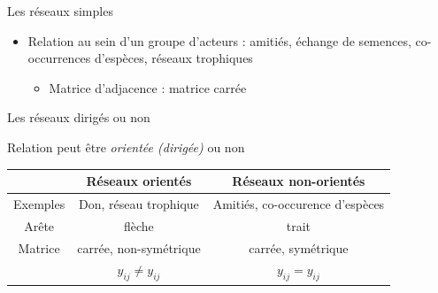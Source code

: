 \documentclass[compress,10pt]{beamer}
\begin{document}
\begin{frame}{Les réseaux simples}

\begin{itemize}

\item Relation au sein d'un groupe d'acteurs :  amitiés, échange de semences, co-occurrences d'espèces, réseaux trophiques
\begin{itemize}
\item Matrice d'adjacence : matrice carrée
\end{itemize}

\end{itemize}
\end{frame}
\begin{frame}{Les réseaux dirigés ou non}

\begin{center}
Relation peut être \emph{orientée (dirigée)} ou non
\end{center}


\begin{tabular}{ccc}
\hline
& \textbf{Réseaux orientés} & \textbf{Réseaux non-orientés}\\
\hline
Exemples &  Don,  réseau trophique & Amitiés, co-occurence d'espèces\\
\hline
Arête & flèche & trait\\
\hline
Matrice  & carrée, non-symétrique& carrée, symétrique\\
& $y_{ij} \neq y_{ij}$ & $y_{ij} = y_{ij}$\\
\hline
\end{tabular}
 

\end{frame}
\end{document}

